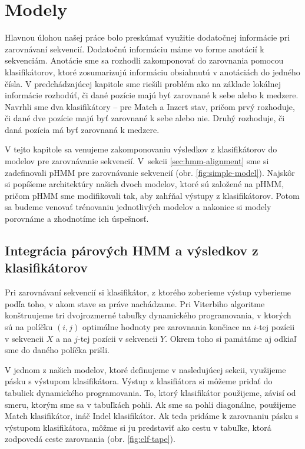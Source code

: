 \chapter{Modely}
\label{chap:models}

Hlavnou úlohou našej práce bolo preskúmať využitie dodatočnej informácie pri zarovnávaní sekvencií. Dodatočnú informáciu máme vo forme anotácií k sekvenciám. Anotácie sme sa rozhodli zakomponovať do zarovnania pomocou klasifikátorov, ktoré zosumarizujú informáciu obsiahnutú v anotáciách do jedného čísla. V predchádzajúcej kapitole sme riešili problém ako na základe lokálnej informácie rozhodúť, či dané pozície majú byť zarovnané k sebe alebo k medzere. Navrhli sme dva klasifikátory -- pre Match a Inzert stav, pričom prvý rozhoduje, či dané dve pozície majú byť zarovnané k sebe alebo nie. Druhý rozhoduje, či daná pozícia má byť zarovnaná k medzere.

V tejto kapitole sa venujeme zakomponovaniu výsledkov z klasifikátorov do modelov pre zarovnávanie sekvencií. V~sekcii \ref{sec:hmm-alignment} sme si zadefinovali pHMM pre zarovnávanie sekvencií (obr. \ref{fig:simple-model}).
Najskôr si popíšeme architektúry našich dvoch modelov, ktoré sú založené na pHMM, pričom pHMM sme modifikovali tak, aby zahŕňal výstupy z klasifikátorov. Potom sa budeme venovať trénovaniu jednotlivých modelov a nakoniec si modely porovnáme a zhodnotíme ich úspešnosť.

\section[Integrácia pHMM a klasifikátorov]{Integrácia párových HMM a výsledkov z klasifikátorov}

Pri zarovnávaní sekvencií si klasifikátor, z ktorého zoberieme výstup vyberieme podľa toho, v akom stave sa práve nachádzame. Pri Viterbiho algoritme konštruujeme tri dvojrozmerné tabuľky dynamického programovania, v ktorých sú na políčku $(i, j)$ optimálne hodnoty pre zarovnania končiace na $i$-tej pozícii v sekvencii $X$ a na $j$-tej pozícii v sekvencii $Y$. Okrem toho si pamätáme aj odkiaľ sme do daného políčka prišli.

V jednom z našich modelov, ktoré definujeme v nasledujúcej sekcii, využijeme pásku s výstupom klasifikátora. Výstup z klasifiátora si môžeme pridať do tabuliek dynamického programovania.
To, ktorý klasifikátor použijeme, závisí od smeru, ktorým sme sa v tabuľkách pohli. Ak sme sa pohli diagonálne, použijeme Match klasifikátor, ináč Indel klasifikátor.
Ak teda pridáme k zarovnaniu pásku s výstupom klasifikátora, môžme si ju predstaviť ako cestu v tabuľke, ktorá zodpovedá ceste zarovnania
(obr. \ref{fig:clf-tape}).



